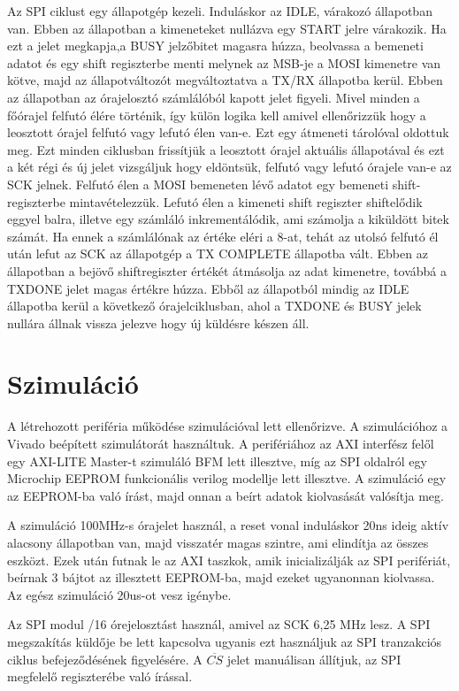 \documentclass[a4paper,11pt]{article}
\begin{document}
Az SPI ciklust egy állapotgép kezeli. Induláskor az IDLE, várakozó állapotban van. Ebben az állapotban a kimeneteket nullázva egy START jelre várakozik. Ha ezt a jelet megkapja,a BUSY jelzőbitet magasra húzza, beolvassa a bemeneti adatot és egy shift regiszterbe menti melynek az MSB-je a MOSI kimenetre van kötve, majd az állapotváltozót megváltoztatva a TX/RX állapotba kerül. Ebben az állapotban az órajelosztó számlálóból kapott jelet figyeli. Mivel minden a főórajel felfutó élére történik, így külön logika kell amivel ellenőrizzük hogy a leosztott órajel felfutó vagy lefutó élen van-e. Ezt egy átmeneti tárolóval oldottuk meg. Ezt minden ciklusban frissítjük a leosztott órajel aktuális állapotával és ezt a két régi és új jelet vizsgáljuk hogy eldöntsük, felfutó vagy lefutó órajele van-e az SCK jelnek. Felfutó élen a MOSI bemeneten lévő adatot egy bemeneti shift-regiszterbe mintavételezzük. Lefutó élen a kimeneti shift regiszter shiftelődik eggyel balra, illetve egy számláló inkrementálódik, ami számolja a kiküldött bitek számát. Ha ennek a számlálónak az értéke eléri a 8-at, tehát az utolsó felfutó él után lefut az SCK az állapotgép a TX COMPLETE állapotba vált. Ebben az állapotban a bejövő shiftregiszter értékét átmásolja az adat kimenetre, továbbá a TXDONE jelet magas értékre húzza. Ebből az állapotból mindig az IDLE állapotba kerül a következő órajelciklusban, ahol a TXDONE és BUSY jelek nullára állnak vissza jelezve hogy új küldésre készen áll.

\section{Szimuláció}
A létrehozott periféria működése szimulációval lett ellenőrizve. A szimulációhoz a Vivado beépített szimulátorát használtuk. A perifériához az AXI interfész felől egy AXI-LITE Master-t szimuláló BFM lett illesztve, míg az SPI oldalról egy Microchip EEPROM funkcionális verilog modellje lett illesztve. A szimuláció egy az EEPROM-ba való írást, majd onnan a beírt adatok kiolvasását valósítja meg.

A szimuláció 100MHz-s órajelet használ, a reset vonal induláskor 20ns ideig aktív alacsony állapotban van, majd visszatér magas szintre, ami elindítja az összes eszközt. Ezek után futnak le az AXI taszkok, amik inicializálják az SPI perifériát, beírnak 3 bájtot az illesztett EEPROM-ba, majd ezeket ugyanonnan kiolvassa. Az egész szimuláció 20us-ot vesz igénybe.

Az SPI modul /16 órejelosztást használ, amivel az SCK 6,25 MHz lesz. A SPI megszakítás küldője be lett kapcsolva ugyanis ezt használjuk az SPI tranzakciós ciklus befejeződésének figyelésére. A $\overline{CS}$ jelet manuálisan állítjuk, az SPI megfelelő regiszterébe való írással.
\end{document}
